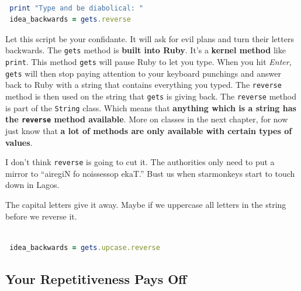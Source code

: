 \documentclass[10pt,twoside]{report}
\begin{document}
\begin{lstlisting}[basicstyle=\ttfamily\color{basiccolor},
    commentstyle = \ttfamily\color{commentcolor},
    keywordstyle=\ttfamily\color{keywordscolor},
    stringstyle=\color{stringcolor},
    language=Ruby,
    basicstyle=\small\ttfamily,
    showstringspaces=false,
  ]

 print "Type and be diabolical: " 
 idea_backwards = gets.reverse

\end{lstlisting}


Let this script be your confidante.  It will ask for evil plans and
turn their letters backwards. The \lstinline[breaklines=true]|gets|
method is {\bf built into Ruby}.  It's a {\bf kernel method} like
\lstinline[breaklines=true]|print|.  This method
\lstinline[breaklines=true]|gets| will pause Ruby to let you type.
When you hit {\em Enter}, \lstinline[breaklines=true]|gets| will then
stop paying attention to your keyboard punchings and answer back to
Ruby with a string that contains everything you typed.  The
\lstinline[breaklines=true]|reverse| method is then used on the string
that \lstinline[breaklines=true]|gets| is giving back.  The
\lstinline[breaklines=true]|reverse| method is part of the
\lstinline[breaklines=true]|String| class.  Which means that {\bf
  anything which is a string has the
  \lstinline[breaklines=true]|reverse| method available}.  More on
classes in the next chapter, for now just know that {\bf a lot of
  methods are only available with certain types of values}.

I don't think \lstinline[breaklines=true]|reverse| is going to cut it.
The authorities only need to put a mirror to ``airegiN fo noissessop
ekaT.''  Bust us when starmonkeys start to touch down in Lagos.

The capital letters give it away.  Maybe if we uppercase all letters
in the string before we reverse it.


\begin{lstlisting}[basicstyle=\ttfamily\color{basiccolor},
    commentstyle = \ttfamily\color{commentcolor},
    keywordstyle=\ttfamily\color{keywordscolor},
    stringstyle=\color{stringcolor},
    language=Ruby,
    basicstyle=\small\ttfamily,
    showstringspaces=false,
  ]

 idea_backwards = gets.upcase.reverse

\end{lstlisting}




\subsection{Your Repetitiveness Pays Off}
\end{document}
